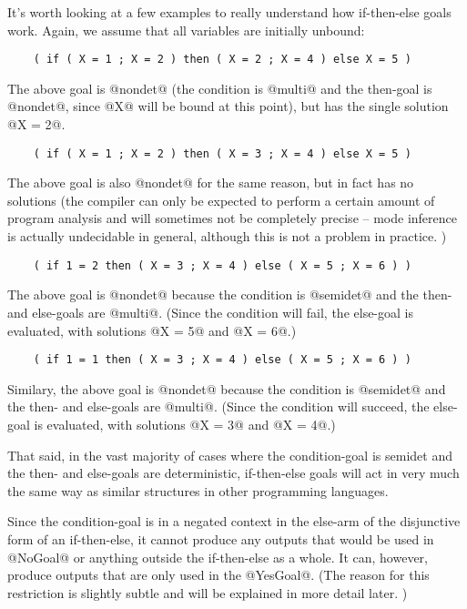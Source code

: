 It's worth looking at a few examples to really understand how
if-then-else goals work.  Again, we assume that all variables
are initially unbound:
\begin{verbatim}
    ( if ( X = 1 ; X = 2 ) then ( X = 2 ; X = 4 ) else X = 5 )
\end{verbatim}
The above goal is @nondet@ (the condition is @multi@
and the then-goal is @nondet@, since @X@ will be bound at this point),
but has the single solution @X = 2@.
\begin{verbatim}
    ( if ( X = 1 ; X = 2 ) then ( X = 3 ; X = 4 ) else X = 5 )
\end{verbatim}
The above goal is also @nondet@ for the same reason, but in fact has no
solutions (the compiler can only be expected to perform a certain amount
of program analysis and will sometimes not be completely precise --
mode inference is actually undecidable in general, although this is not
a problem in practice.  )
\begin{verbatim}
    ( if 1 = 2 then ( X = 3 ; X = 4 ) else ( X = 5 ; X = 6 ) )
\end{verbatim}
The above goal is @nondet@ because the condition is @semidet@ and the
then- and else-goals are
@multi@.  (Since the condition will fail, the
else-goal is evaluated, with solutions @X = 5@ and @X = 6@.)
\begin{verbatim}
    ( if 1 = 1 then ( X = 3 ; X = 4 ) else ( X = 5 ; X = 6 ) )
\end{verbatim}
Similary, the above goal is @nondet@ because the condition is @semidet@
and the then- and else-goals are
@multi@.  (Since the condition will succeed, the
else-goal is evaluated, with solutions @X = 3@ and @X = 4@.)

That said, in the vast majority of cases where the
condition-goal is semidet and the then- and else-goals are
deterministic, if-then-else goals will act in very much the
same way as similar structures in other programming languages.

Since the condition-goal is in a negated context in the else-arm
of the disjunctive form of an if-then-else, it cannot
produce any outputs that would be used in @NoGoal@ or anything
outside the if-then-else as a whole.  It can, however, produce
outputs that are only used in the @YesGoal@.  (The reason for
this restriction is slightly subtle and will be explained in
more detail later.  )

